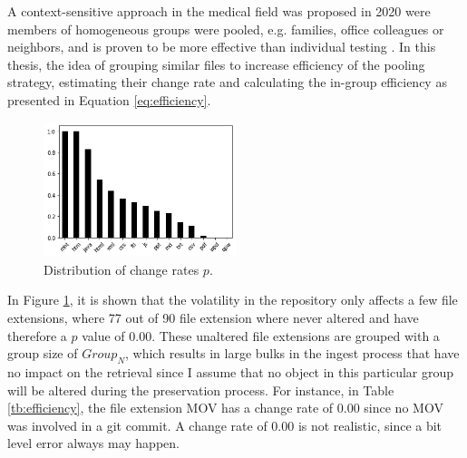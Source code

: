 \documentclass[final]{vutinfth}
\begin{document}
A context-sensitive approach in the medical field was proposed in 2020 were members of homogeneous groups were pooled, e.g. families, office colleagues or neighbors, and is proven to be more effective than individual testing \cite[4]{deckert2020simulation}. In this thesis, the idea of grouping similar files to increase efficiency of the pooling strategy, estimating their change rate and calculating the in-group efficiency as presented in Equation \ref{eq:efficiency}.
\begin{figure}[t]\centering
    \includegraphics[width=0.5\textwidth]{graphics/p-distribution.png}
    \caption{Distribution of change rates $p$.}\label{fig:p-distribution}
\end{figure}
In Figure \ref{fig:p-distribution}, it is shown that the volatility in the repository only affects a few file extensions, where 77 out of 90 file extension where never altered and have therefore a $p$ value of 0.00. These unaltered file extensions are grouped with a group size of $Group_N$, which results in large bulks in the ingest process that have no impact on the retrieval since I assume that no object in this particular group will be altered during the preservation process. For instance, in Table \ref{tb:efficiency}, the file extension MOV has a change rate of 0.00 since no MOV was involved in a git commit. A change rate of 0.00 is not realistic, since a bit level error always may happen.
\end{document}
